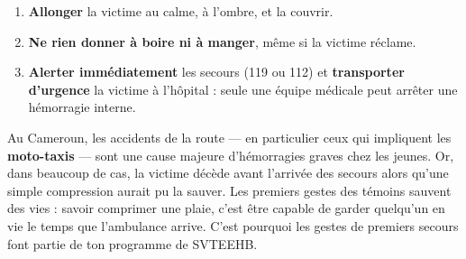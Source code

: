 \documentclass[11pt]{article}
\begin{document}
\begin{aretenir}
\begin{enumerate}
\item \textbf{Allonger} la victime au calme, à l'ombre, et la couvrir.
\item \textbf{Ne rien donner à boire ni à manger}, même si la victime réclame.
\item \textbf{Alerter immédiatement} les secours (119 ou 112) et \textbf{transporter d'urgence} la victime à l'hôpital : seule une équipe médicale peut arrêter une hémorragie interne.
\end{enumerate}
\end{aretenir}

\begin{savaistu}
Au Cameroun, les accidents de la route — en particulier ceux qui impliquent les \textbf{moto-taxis} — sont une cause majeure d'hémorragies graves chez les jeunes. Or, dans beaucoup de cas, la victime décède avant l'arrivée des secours alors qu'une simple compression aurait pu la sauver. Les premiers gestes des témoins sauvent des vies : savoir comprimer une plaie, c'est être capable de garder quelqu'un en vie le temps que l'ambulance arrive. C'est pourquoi les gestes de premiers secours font partie de ton programme de SVTEEHB.
\end{savaistu}
\end{document}
